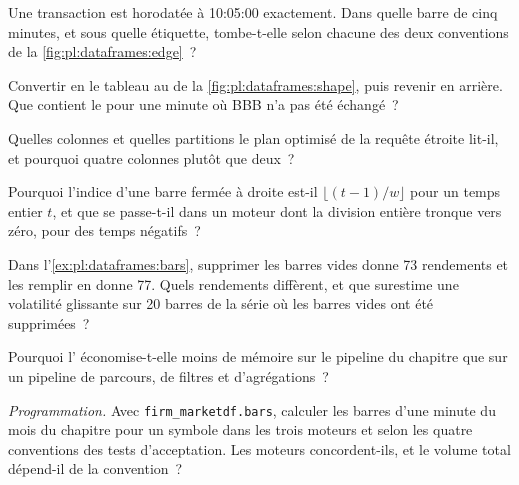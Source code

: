 \begin{exercise}[$\star$]\label{exo:pl:dataframes:1}
Une transaction est horodatée à 10:05:00 exactement. Dans quelle barre de cinq minutes, et sous quelle étiquette, tombe-t-elle selon chacune des deux conventions
de la \cref{fig:pl:dataframes:edge}~?
\end{exercise}

\begin{exercise}[$\star$]\label{exo:pl:dataframes:2}
Convertir en  le tableau au  de la \cref{fig:pl:dataframes:shape}, puis revenir en arrière. Que contient le  pour une minute où BBB
n'a pas été échangé~?
\end{exercise}

\begin{exercise}[$\star$]\label{exo:pl:dataframes:3}
Quelles colonnes et quelles partitions le plan optimisé de la requête étroite lit-il, et pourquoi quatre colonnes plutôt que deux~?
\end{exercise}

\begin{exercise}[$\star\star$]\label{exo:pl:dataframes:4}
Pourquoi l'indice d'une barre fermée à droite est-il $\lfloor (t-1)/w \rfloor$ pour un temps entier $t$, et que se passe-t-il dans un moteur dont la division entière
tronque vers zéro, pour des temps négatifs~?
\end{exercise}

\begin{exercise}[$\star\star$]\label{exo:pl:dataframes:5}
Dans l'\cref{ex:pl:dataframes:bars}, supprimer les barres vides donne 73 rendements et les remplir en donne 77. Quels rendements diffèrent, et que surestime une
volatilité glissante sur 20 barres de la série où les barres vides ont été supprimées~?
\end{exercise}

\begin{exercise}[$\star\star$]\label{exo:pl:dataframes:6}
Pourquoi l' économise-t-elle moins de mémoire sur le pipeline du chapitre que sur un pipeline de parcours, de filtres et d'agrégations~?
\end{exercise}

\begin{exercise}[$\star\star\star$]\label{exo:pl:dataframes:7}
\emph{Programmation.} Avec \texttt{firm\_marketdf.bars}, calculer les barres d'une minute du mois du chapitre pour un symbole dans les trois moteurs et
selon les quatre conventions des tests d'acceptation. Les moteurs concordent-ils, et le volume total dépend-il de la convention~?
\end{exercise}

